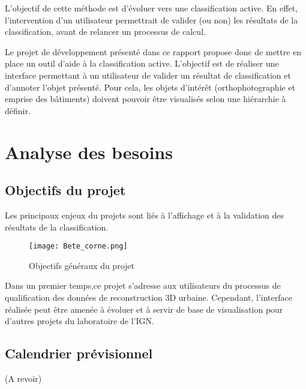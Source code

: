 L'objectif de cette méthode est d'évoluer vers une classification active. En effet, l'intervention d'un utilisateur permettrait de valider (ou non) les résultats de la classification, avant de relancer un processus de calcul.\newline
 
Le projet de développement présenté dans ce rapport propose donc de mettre en place un outil d'aide à la classification active. L'objectif est de réaliser une interface permettant à un utilisateur de valider un résultat de classification et d'annoter l'objet présenté. Pour cela, les objets d'intérêt (orthophotographie et emprise des bâtiments) doivent pouvoir être visualisés selon une hiérarchie à définir.\newline


\section{Analyse des besoins}

\subsection{Objectifs du projet}

Les principaux enjeux du projets sont liés à l'affichage et à la validation des résultats de la classification.

\begin{figure}[!h]
	\begin{center}
		\texttt{[image: Bete\_corne.png]}  \\
		\caption[Objectifs généraux du projet]{Objectifs généraux du projet}
		\label{fig:betecorne}
	\end{center}
\end{figure}

Dans un premier temps,ce projet s'adresse aux utilisateurs du processus de qualification des données de reconstruction 3D urbaine. Cependant, l'interface réalisée peut être amenée à évoluer et à servir de base de visualisation pour d'autres projets du laboratoire de l'IGN. 

\subsection{Calendrier prévisionnel}

(A revoir)